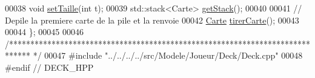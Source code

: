 \begin{DoxyCode}
00038     \textcolor{keywordtype}{void} \hyperlink{class_deck_a9374c3f2a2fbd5e75990eee1e2404067}{setTaille}(\textcolor{keywordtype}{int} t);
00039     std::stack<Carte> \hyperlink{class_deck_ae325fade14ad5ae5912d06d0b85a85af}{getStack}();
00040     
00041     \textcolor{comment}{// Depile la premiere carte de la pile et la renvoie}
00042     \hyperlink{class_carte}{Carte} \hyperlink{class_deck_a6f6eb6ba96a0b6e04d3a033a6ce409ea}{tirerCarte}();
00043       
00044 \};
00045 
00046 \textcolor{comment}{/*****************************************************************************
      */}
00047 \textcolor{preprocessor}{#include "../../../../src/Modele/Joueur/Deck/Deck.cpp"}
00048 \textcolor{preprocessor}{#endif // DECK\_HPP}
\end{DoxyCode}
